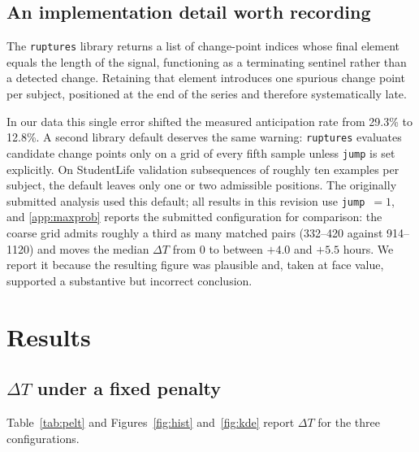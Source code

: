 \documentclass[preprint,12pt,authoryear]{elsarticle}
\newcommand{\dt}{$\Delta T$}
\providecommand{\DIFaddtex}[1]{{\protect\color{blue} \sf #1}} %
\providecommand{\DIFaddbegin}{} %
\providecommand{\DIFaddend}{} %
\providecommand{\DIFadd}[1]{\texorpdfstring{\DIFaddtex{#1}}{#1}} %
\newcommand{\DIFaddincludegraphics}[2][]{{\color{blue}\fbox{\DIFOincludegraphics[#1]{#2}}}} %
\DeclareRobustCommand{\DIFaddbegin}{\DIFOaddbegin \let\includegraphics\DIFaddincludegraphics} %
\DeclareRobustCommand{\DIFaddend}{\DIFOaddend \let\includegraphics\DIFOincludegraphics} %
\begin{document}
\subsection{An implementation detail worth recording}

The \texttt{ruptures} library \citep{truong2020} returns a list of
change-point indices whose final element equals the length of the
signal, functioning as a terminating sentinel rather than a detected
change. Retaining that element introduces one spurious change point per
subject, positioned at the end of the series and therefore
systematically late.

In our data this single error shifted the measured anticipation rate
from 29.3\% to 12.8\%. \DIFaddbegin \DIFadd{A second library default deserves the same
warning: \texttt{ruptures} evaluates candidate change points only on a
grid of every fifth sample unless \texttt{jump} is set explicitly. On
StudentLife validation subsequences of roughly ten examples per
subject, the default leaves only one or two admissible positions. The
originally submitted analysis used this default; all results in this
revision use \texttt{jump}~$=1$, and \ref{app:maxprob}
reports the submitted configuration for comparison: the coarse grid
admits roughly a third as many matched pairs (332--420 against
914--1120) and moves the median \dt{} from 0 to between $+4.0$ and
$+5.5$ hours. }\DIFaddend We report it because the resulting figure was
plausible and, taken at face value, supported a substantive but
incorrect conclusion.

\section{Results}
\DIFaddbegin \label{sec:results}
\DIFaddend %

\subsection{\dt{} under a fixed penalty}
\DIFaddbegin \label{sec:fixedpen}
\DIFaddend 

Table~\ref{tab:pelt} and Figures~\ref{fig:hist} and~\ref{fig:kde}
report \dt{} for the three configurations.
\end{document}
